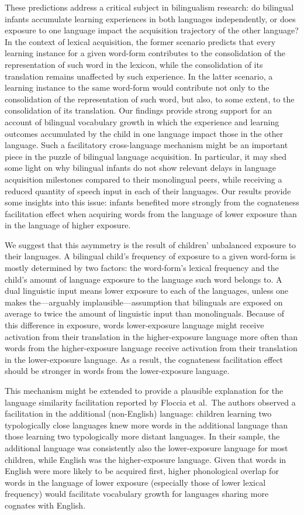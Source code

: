 \documentclass[
]{article}
\begin{document}
These predictions address a critical subject in bilingualism research:
do bilingual infants accumulate learning experiences in both languages
independently, or does exposure to one language impact the acquisition
trajectory of the other language? In the context of lexical acquisition,
the former scenario predicts that every learning instance for a given
word-form contributes to the consolidation of the representation of such
word in the lexicon, while the consolidation of its translation remains
unaffected by such experience. In the latter scenario, a learning
instance to the same word-form would contribute not only to the
consolidation of the representation of such word, but also, to some
extent, to the consolidation of its translation. Our findings provide
strong support for an account of bilingual vocabulary growth in which
the experience and learning outcomes accumulated by the child in one
language impact those in the other language. Such a facilitatory
cross-language mechanism might be an important piece in the puzzle of
bilingual language acquisition. In particular, it may shed some light on
why bilingual infants do not show relevant delays in language
acquisition milestones compared to their monolingual peers, while
receiving a reduced quantity of speech input in each of their languages.
Our results provide some insights into this issue: infants benefited
more strongly from the cognateness facilitation effect when acquiring
words from the language of lower exposure than in the language of higher
exposure.

We suggest that this asymmetry is the result of children' unbalanced
exposure to their languages. A bilingual child's frequency of exposure
to a given word-form is mostly determined by two factors: the
word-form's lexical frequency and the child's amount of language
exposure to the language such word belongs to. A dual linguistic input
means lower exposure to each of the languages, unless one makes
the---arguably implausible---assumption that bilinguals are exposed on
average to twice the amount of linguistic input than monolinguals.
Because of this difference in exposure, words lower-exposure language
might receive activation from their translation in the higher-exposure
language more often than words from the higher-exposure language receive
activation from their translation in the lower-exposure language. As a
result, the cognateness facilitation effect should be stronger in words
from the lower-exposure language.

This mechanism might be extended to provide a plausible explanation for
the language similarity facilitation reported by Floccia et al.~The
authors observed a facilitation in the additional (non-English)
language: children learning two typologically close languages knew more
words in the additional language than those learning two typologically
more distant languages. In their sample, the additional language was
consistently also the lower-exposure language for most children, while
English was the higher-exposure language. Given that words in English
were more likely to be acquired first, higher phonological overlap for
words in the language of lower exposure (especially those of lower
lexical frequency) would facilitate vocabulary growth for languages
sharing more cognates with English.
\end{document}
